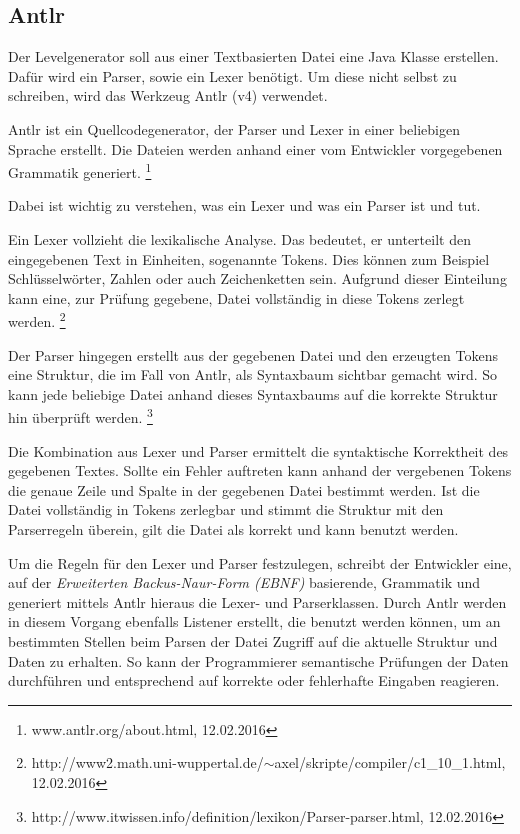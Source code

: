 \subsection{Antlr}

Der Levelgenerator soll aus einer Textbasierten Datei eine Java Klasse erstellen. Dafür wird ein Parser, sowie ein Lexer benötigt. Um diese nicht selbst zu schreiben, wird das Werkzeug Antlr (v4) verwendet.

Antlr ist ein Quellcodegenerator, der Parser und Lexer in einer beliebigen Sprache erstellt. Die Dateien werden anhand einer vom Entwickler vorgegebenen Grammatik generiert. \footnote{www.antlr.org/about.html, 12.02.2016} 

Dabei ist wichtig zu verstehen, was ein Lexer und was ein Parser ist und tut. 

Ein Lexer vollzieht die lexikalische Analyse. Das bedeutet, er unterteilt den eingegebenen Text in Einheiten, sogenannte Tokens. Dies können zum Beispiel Schlüsselwörter, Zahlen oder auch Zeichenketten sein. Aufgrund dieser Einteilung kann eine, zur Prüfung gegebene, Datei vollständig in diese Tokens zerlegt werden. 
\footnote{http://www2.math.uni-wuppertal.de/$\sim$axel/skripte/compiler/c1\_10\_1.html, 12.02.2016} 

Der Parser hingegen erstellt aus der gegebenen Datei und den erzeugten Tokens eine Struktur, die im Fall von Antlr, als Syntaxbaum sichtbar gemacht wird. So kann jede beliebige Datei anhand dieses Syntaxbaums auf die korrekte Struktur hin überprüft werden. \footnote{http://www.itwissen.info/definition/lexikon/Parser-parser.html, 12.02.2016}

Die Kombination aus Lexer und Parser ermittelt die syntaktische Korrektheit des gegebenen Textes. Sollte ein Fehler auftreten kann anhand der vergebenen Tokens die genaue Zeile und Spalte in der gegebenen Datei bestimmt werden. Ist die Datei vollständig in Tokens zerlegbar und stimmt die Struktur mit den Parserregeln überein, gilt die Datei als korrekt und kann benutzt werden.

Um die Regeln für den Lexer und Parser festzulegen, schreibt der Entwickler eine, auf der \textit{Erweiterten Backus-Naur-Form (EBNF)} basierende, Grammatik und generiert mittels Antlr hieraus die Lexer- und Parserklassen. Durch Antlr werden in diesem Vorgang ebenfalls Listener erstellt, die benutzt werden können, um an bestimmten Stellen beim Parsen der Datei Zugriff auf die aktuelle Struktur und Daten zu erhalten. So kann der Programmierer semantische Prüfungen der Daten durchführen und entsprechend auf korrekte oder fehlerhafte Eingaben reagieren.

